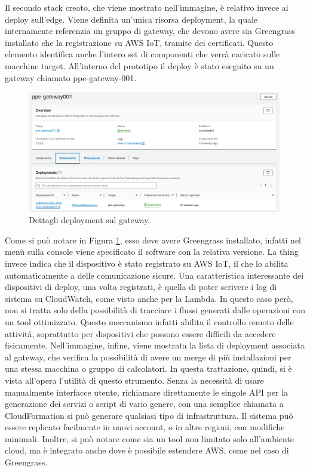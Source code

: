 Il secondo stack creato, che viene mostrato nell'immagine, è relativo invece ai deploy sull'edge. Viene definita un'unica risorsa deployment, la quale internamente referenzia un gruppo di gateway, che devono avere sia Greengrass installato che la registrazione su AWS IoT, tramite dei certificati. Questo elemento identifica anche l'intero set di componenti che verrà caricato sulle macchine target. All'interno del prototipo il deploy è stato eseguito su un gateway chiamato ppe-gateway-001. 

\begin{figure}[htbp]
    \centering
    \includegraphics[width=0.99\textwidth]{figures/gateway-specs.png}
    \caption{Dettagli deployment sul gateway.} 
    \label{fig:gateway-specs}
\end{figure}

Come si può notare in Figura \ref{fig:gateway-specs}, esso deve avere Greengrass installato, infatti nel menù sulla console viene specificato il software con la relativa versione. La thing invece indica che il dispositivo è stato registrato su AWS IoT, il che lo abilita automaticamente a delle comunicazione sicure. Una caratteristica interessante dei dispositivi di deploy, una volta registrati, è quella di poter scrivere i log di sistema su CloudWatch, come visto anche per la Lambda. In questo caso però, non si tratta solo della possibilità di tracciare i flussi generati dalle operazioni con un tool ottimizzato. Questo meccanismo infatti abilita il controllo remoto delle attività, soprattutto per dispositivi che possono essere difficili da accedere fisicamente. Nell'immagine, infine, viene mostrata la lista di deployment associata al gateway, che verifica la possibilità di avere un merge di più installazioni per una stessa macchina o gruppo di calcolatori. In questa trattazione, quindi, si è vista all'opera l'utilità di questo strumento. Senza la necessità di usare manualmente interfacce utente, richiamare direttamente le singole API per la generazione dei servizi o script di vario genere, con una semplice chiamata a CloudFormation si può generare qualsiasi tipo di infrastruttura. Il sistema può essere replicato facilmente in nuovi account, o in altre regioni, con modifiche minimali. Inoltre, si può notare come sia un tool non limitato solo all'ambiente cloud, ma è integrato anche dove è possibile estendere AWS, come nel caso di Greengrass.  

